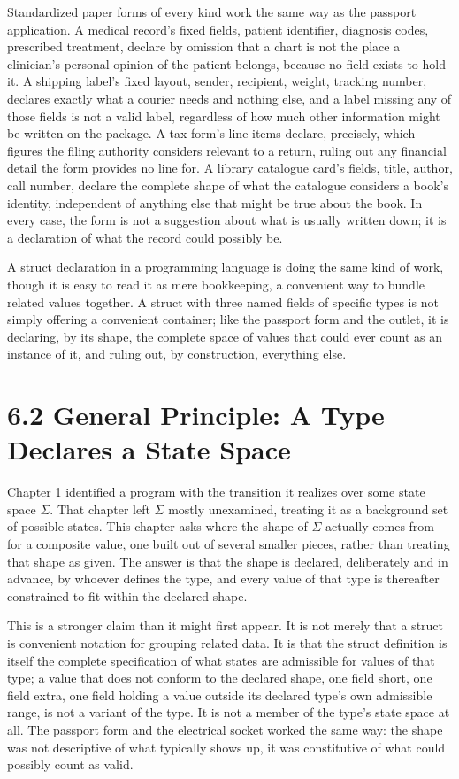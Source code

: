 \documentclass[11pt]{book}
\begin{document}
Standardized paper forms of every kind work the same way as the passport application. A medical record's fixed fields, patient identifier, diagnosis codes, prescribed treatment, declare by omission that a chart is not the place a clinician's personal opinion of the patient belongs, because no field exists to hold it. A shipping label's fixed layout, sender, recipient, weight, tracking number, declares exactly what a courier needs and nothing else, and a label missing any of those fields is not a valid label, regardless of how much other information might be written on the package. A tax form's line items declare, precisely, which figures the filing authority considers relevant to a return, ruling out any financial detail the form provides no line for. A library catalogue card's fields, title, author, call number, declare the complete shape of what the catalogue considers a book's identity, independent of anything else that might be true about the book. In every case, the form is not a suggestion about what is usually written down; it is a declaration of what the record could possibly be.

A struct declaration in a programming language is doing the same kind of work, though it is easy to read it as mere bookkeeping, a convenient way to bundle related values together. A struct with three named fields of specific types is not simply offering a convenient container; like the passport form and the outlet, it is declaring, by its shape, the complete space of values that could ever count as an instance of it, and ruling out, by construction, everything else.

\section*{6.2 General Principle: A Type Declares a State Space}

Chapter 1 identified a program with the transition it realizes over some state space $\Sigma$. That chapter left $\Sigma$ mostly unexamined, treating it as a background set of possible states. This chapter asks where the shape of $\Sigma$ actually comes from for a composite value, one built out of several smaller pieces, rather than treating that shape as given. The answer is that the shape is declared, deliberately and in advance, by whoever defines the type, and every value of that type is thereafter constrained to fit within the declared shape.

This is a stronger claim than it might first appear. It is not merely that a struct is convenient notation for grouping related data. It is that the struct definition is itself the complete specification of what states are admissible for values of that type; a value that does not conform to the declared shape, one field short, one field extra, one field holding a value outside its declared type's own admissible range, is not a variant of the type. It is not a member of the type's state space at all. The passport form and the electrical socket worked the same way: the shape was not descriptive of what typically shows up, it was constitutive of what could possibly count as valid.
\end{document}
